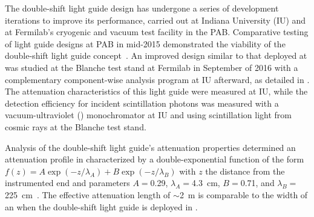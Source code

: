 
The double-shift light guide design has undergone a series of development iterations to improve its performance, carried out at Indiana University (IU) and at Fermilab's cryogenic and vacuum test facility in the PAB. Comparative testing of light guide designs at PAB in mid-2015 demonstrated the viability of the double-shift light guide concept~\cite{bib:JINST-11-C05019}. 
An improved design similar to that deployed at  was studied at the Blanche test stand at Fermilab in September of 2016 with a complementary component-wise analysis program at IU afterward, as detailed in \cite{bib:DoubleShiftLG-NIM-171113}. The attenuation characteristics of this light guide were measured at IU, while the  detection efficiency for incident \lar scintillation photons was measured with a vacuum-ultraviolet () monochromator at IU and using scintillation light from cosmic rays at the Blanche test stand.


Analysis of the double-shift light guide's attenuation properties determined an attenuation profile in \lar characterized by a double-exponential function of the form $f(z) = A \exp(-z/\lambda_{A}) + B \exp(-z/\lambda_B)$ with $z$ the distance from the instrumented end and parameters $A = $0.29, $\lambda_A = $4.3~cm, $B = $0.71, and $\lambda_B = $225~cm~\cite{bib:DoubleShiftLG-NIM-171113}. The effective attenuation length of $\sim$\SI{2}{m} is comparable to the width of an  when the double-shift light guide is deployed in \lar.


